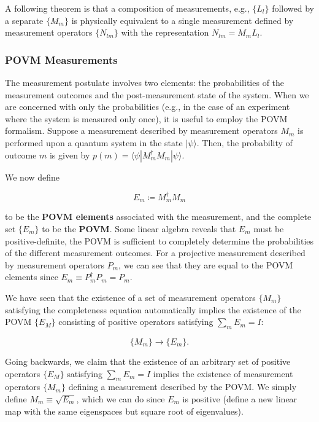 \documentclass{article}
\begin{document}
      \begin{theorem}
      A following theorem is that a composition of measurements, e.g., $\{L_l\}$ followed by a separate $\{M_m\}$ is physically equivalent to a single measurement defined by measurement operators $\{N_{lm}\}$ with the representation $N_{lm} = M_m L_l$.  
      \end{theorem}

    \subsubsection{POVM Measurements} 

      The measurement postulate involves two elements: the probabilities of the measurement outcomes and the post-measurement state of the system. When we are concerned with only the probabilities (e.g., in the case of an experiment where the system is measured only once), it is useful to employ the POVM formalism. Suppose a measurement described by measurement operators $M_m$ is performed upon a quantum system in the state $|\psi\rangle$. Then, the probability of outcome $m$ is given by $p(m) = \langle \psi | M_m^\dagger M_m | \psi \rangle$. 

      We now define

        \[E_m \coloneqq M_m^\dagger M_m\]

      to be the \textbf{POVM elements} associated with the measurement, and the complete set $\{E_m\}$ to be the \textbf{POVM}. Some linear algebra reveals that $E_m$ must be positive-definite, the POVM is sufficient to completely determine the probabilities of the different measurement outcomes. For a projective measurement described by measurement operators $P_m$, we can see that they are equal to the POVM elements since $E_m \equiv P_m^\dagger P_m = P_m$.

      We have seen that the existence of a set of measurement operators $\{M_m\}$ satisfying the completeness equation automatically implies the existence of the POVM $\{E_M\}$ consisting of positive operators satisfying $\sum_m E_m = I$:

        \[\{M_m\} \longrightarrow \{E_m\}.\]

      Going backwards, we claim that the existence of an arbitrary set of positive operators $\{E_M\}$ satisfying $\sum_m E_m = I$ implies the existence of measurement operators $\{M_m\}$ defining a measurement described by the POVM. We simply define $M_m \equiv \sqrt{E_m}$, which we can do since $E_m$ is positive (define a new linear map with the same eigenspaces but square root of eigenvalues).
\end{document}
